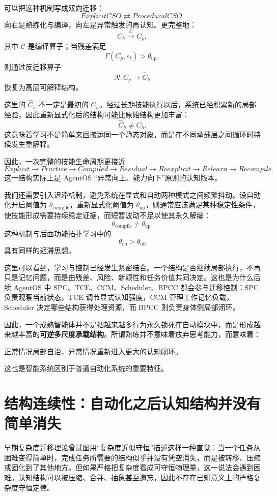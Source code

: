 可以把这种机制写成双向迁移：
\[
ExplicitCSO
\rightleftarrows
ProceduralCSO.
\]
向右是熟练化与编译，向左是异常触发的再认知。更完整地：
\[
C_h
\xrightarrow{\mathcal C}
C_p,
\]
其中 $\mathcal C$ 是编译算子；当残差满足
\[
\Gamma(C_p,e_t)>\theta_{\mathrm{up}},
\]
则通过反迁移算子
\[
\mathcal R:
C_p
\rightarrow
\hat C_h
\]
恢复为高层可解释结构。

这里的 $\hat C_h$ 不一定是最初的 $C_h$。经过长期技能执行以后，系统已经积累新的局部经验，因此重新显式化后的结构可能比原始结构更加丰富：
\[
\hat C_h
\neq
C_h.
\]
这意味着学习不是简单来回搬运同一个静态对象，而是在不同承载层之间循环时持续发生重解释。

因此，一次完整的技能生命周期更接近
\[
Explicit
\rightarrow
Practice
\rightarrow
Compiled
\rightarrow
Residual
\rightarrow
Reexplicit
\rightarrow
Relearn
\rightarrow
Recompile.
\]
这一结构实际上是 AgentOS “异常向上、能力向下”原则的认知版本。

我们还需要引入迟滞机制，避免系统在显式和自动两种模式之间频繁抖动。设自动化开启阈值为 $\theta_{\mathrm{compile}}$，重新显式化阈值为 $\theta_{\mathrm{up}}$，则通常应该满足某种稳定性条件，使技能形成需要持续稳定证据，而短暂波动不足以使其永久解编：
\[
\theta_{\mathrm{compile}}
\neq
\theta_{\mathrm{up}}.
\]
这种机制与后面功能拓扑学习中的
\[
\theta_{\mathrm{on}}
>
\theta_{\mathrm{off}}
\]
具有同样的迟滞思想。

这里可以看到，学习与控制已经发生紧密结合。一个结构是否继续局部执行，不再只是记忆问题，而是由残差、风险、新颖性和任务价值共同决定。这也是为什么后续 AgentOS 中 SPC、TCE、CCM、Scheduler、BPCC 都会参与迁移控制：SPC 负责观察当前状态，TCE 调节显式认知强度，CCM 管理工作记忆负载，Scheduler 决定哪些结构获得处理资源，而 BPCC 则负责身体侧局部闭环。

因此，一个成熟智能体并不是把越来越多行为永久锁死在自动模块中，而是形成越来越丰富的\textbf{可逆多尺度承载结构}。所谓熟练并不意味着放弃思考能力，而意味着：
\begin{statementbox}
正常情况局部自治，异常情况重新进入更大的认知闭环。
\end{statementbox}
这也是智能系统区别于普通自动化系统的重要特征。


\section{结构连续性：自动化之后认知结构并没有简单消失}

早期复杂度迁移理论曾试图用“复杂度近似守恒”描述这样一种直觉：当一个任务从困难变得简单时，完成任务所需要的结构似乎并没有凭空消失，而是被转移、压缩或固化到了其他地方。但如果严格把复杂度看成可守恒物理量，这一说法会遇到困难。认知结构可以被压缩、合并、抽象甚至遗忘，因此不存在已知意义上的严格复杂度守恒定律。

